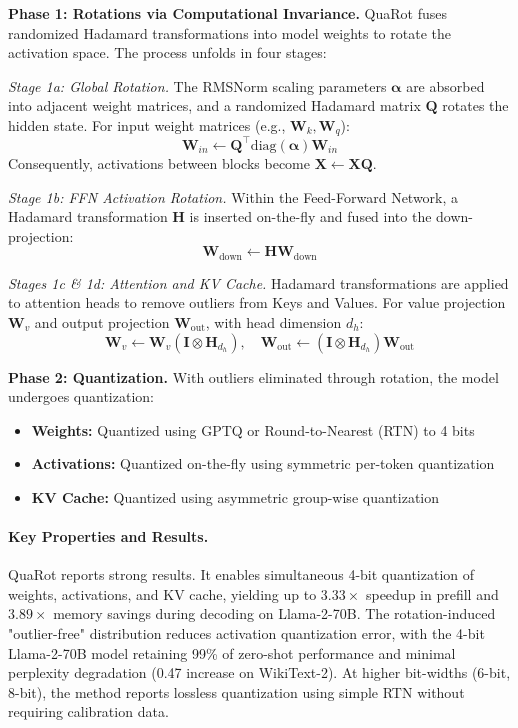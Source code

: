 \textbf{Phase 1: Rotations via Computational Invariance.} QuaRot fuses randomized Hadamard transformations into model weights to rotate the activation space. The process unfolds in four stages:

\textit{Stage 1a: Global Rotation.} The RMSNorm scaling parameters $\bm{\alpha}$ are absorbed into adjacent weight matrices, and a randomized Hadamard matrix $\bm{Q}$ rotates the hidden state. For input weight matrices (e.g., $\bm{W}_k, \bm{W}_q$):
\begin{equation}
  \bm{W}_{in} \leftarrow \bm{Q}^\top \text{diag}(\bm{\alpha}) \bm{W}_{in}
\end{equation}
Consequently, activations between blocks become $\bm{X} \leftarrow \bm{X}\bm{Q}$.

\textit{Stage 1b: FFN Activation Rotation.} Within the Feed-Forward Network, a Hadamard transformation $\bm{H}$ is inserted on-the-fly and fused into the down-projection:
\begin{equation}
  \bm{W}_{\text{down}} \leftarrow \bm{H} \bm{W}_{\text{down}}
\end{equation}

\textit{Stages 1c \& 1d: Attention and KV Cache.} Hadamard transformations are applied to attention heads to remove outliers from Keys and Values. For value projection $\bm{W}_v$ and output projection $\bm{W}_{\text{out}}$, with head dimension $d_h$:
\begin{equation}
  \bm{W}_v \leftarrow \bm{W}_v (\bm{I} \otimes \bm{H}_{d_h}), \quad \bm{W}_{\text{out}} \leftarrow (\bm{I} \otimes \bm{H}_{d_h}) \bm{W}_{\text{out}}
\end{equation}

\textbf{Phase 2: Quantization.} With outliers eliminated through rotation, the model undergoes quantization:
\begin{itemize}
\item \textbf{Weights:} Quantized using GPTQ or Round-to-Nearest (RTN) to 4 bits
\item \textbf{Activations:} Quantized on-the-fly using symmetric per-token quantization
\item \textbf{KV Cache:} Quantized using asymmetric group-wise quantization
\end{itemize}

\paragraph{Key Properties and Results.}
QuaRot reports strong results. It enables simultaneous 4-bit quantization of weights, activations, and KV cache, yielding up to $3.33\times$ speedup in prefill and $3.89\times$ memory savings during decoding on Llama-2-70B. The rotation-induced "outlier-free" distribution reduces activation quantization error, with the 4-bit Llama-2-70B model retaining 99\% of zero-shot performance and minimal perplexity degradation (0.47 increase on WikiText-2). At higher bit-widths (6-bit, 8-bit), the method reports lossless quantization using simple RTN without requiring calibration data.

